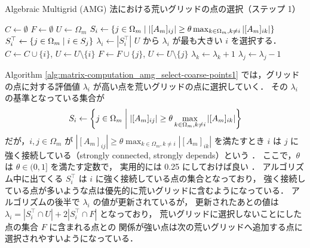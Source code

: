 \begin{algorithm}[tp]
    \caption{Algebraic Multigrid (AMG) 法における荒いグリッドの点の選択（ステップ 1） \cite{Ruge1987}}
    \label{alg:matrix-computation_amg_select-coarse-points1}
    \begin{algorithmic}
        \State $C \gets \emptyset$
        \State $F \gets \emptyset$
        \State $U \gets \Omega_m$
        \State $S_i \gets \left\{j \in \Omega_m \relmiddle| %
            \left| [A_m]_{ij} \right| \ge \theta %
            \max_{k \in \Omega_m, k \neq i} \left| [A_m]_{ik} \right| \right\}$
        \Comment{$\theta$ は $\theta \in (0, 1]$ な定数}
        \EndFor
        \State $S_i^\top \gets \left\{ j \in \Omega_m \mathrel{}\middle|\mathrel{} i \in S_j \right\}$
        \State $\lambda_i \gets \left| S_i^\top \right|$
        \EndFor
        \State $U$ から $\lambda_i$ が最も大きい $i$ を選択する．
        \State $C \gets C \cup \{i\}$, $U \gets U \setminus \{i\}$
        \State $F \gets F \cup \{j\}$, $U \gets U \setminus \{j\}$
        \State $\lambda_k \gets \lambda_k + 1$
        \EndFor
        \EndFor
        \State $\lambda_j \gets \lambda_j - 1$
        \EndFor
        \EndWhile
        \EndProcedure
    \end{algorithmic}
\end{algorithm}

Algorithm \ref{alg:matrix-computation_amg_select-coarse-points1}
では，グリッドの点に対する評価値 $\lambda_i$ が高い点を荒いグリッドの点に選択していく．
その $\lambda_i$ の基準となっている集合が
\begin{equation}
    S_i \gets \left\{j \in \Omega_m \relmiddle| %
    \left| [A_m]_{ij} \right| \ge \theta %
    \max_{k \in \Omega_m, k \neq i} \left| [A_m]_{ik} \right| \right\}
\end{equation}
だが，$i, j \in \Omega_m$ が
$\left| [A_m]_{ij} \right| \ge \theta %
    \max_{k \in \Omega_m, k \neq i} \left| [A_m]_{ik} \right|$
を満たすとき $i$ は $j$ に強く接続している（strongly connected, strongly depends）という
\cite{Ruge1987}．
ここで，$\theta$ は $\theta \in (0, 1]$ を満たす定数で，
実用的には 0.25 にしておけば良い
\cite{Ruge1987}．
アルゴリズム中に出てくる $S_i^\top$ は $i$ に強く接続している点の集合となっており，
強く接続している点が多いような点は優先的に荒いグリッドに含むようになっている．
アルゴリズムの後半で $\lambda_i$ の値が更新されているが，
更新されたあとの値は
$\lambda_i = \left|S_i^\top \cap U\right| + 2 \left|S_i^\top \cap F\right|$
となっており，
荒いグリッドに選択しないことにした点の集合 $F$ に含まれる点との
関係が強い点は次の荒いグリッドへ追加する点に選択されやすいようになっている．

